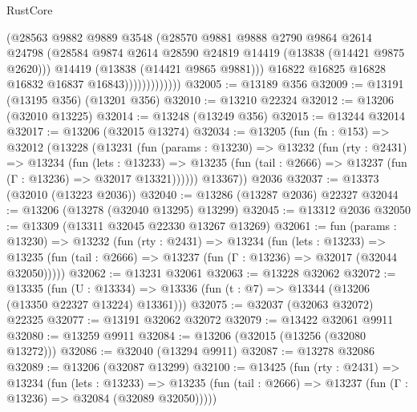 \begin{lexlean}{RustCore}
\begin{coremodule}
                            (@28563
                              @9882
                              @9889
                              @3548
                              (@28570
                                @9881
                                @9888
                                @2790
                                @9864
                                @2614
                                @24798
                                (@28584
                                  @9874
                                  @2614
                                  @28590
                                  @24819
                                  @14419
                                  (@13838 (@14421 @9875 @2620)))
                                @14419
                                (@13838 (@14421 @9865 @9881)))
                              @16822
                              @16825
                              @16828
                              @16832
                              @16837
                              @16843)))))))))))))
@32005 := @13189 @356
@32009 := @13191 (@13195 @356) (@13201 @356)
@32010 := @13210 @22324
@32012 := @13206 (@32010 @13225)
@32014 := @13248 (@13249 @356)
@32015 := @13244 @32014
@32017 := @13206 (@32015 @13274)
@32034 := @13205
    (fun (fn : @153) =>
    @32012
      (@13228
        (@13231
          (fun (params : @13230) =>
          @13232
            (fun (rty : @2431) =>
            @13234
              (fun (lets : @13233) =>
              @13235 (fun (tail : @2666) => @13237 (fun (Γ : @13236) => @32017 @13321))))))
        @13367))
    @2036
@32037 := @13373 (@32010 (@13223 @2036))
@32040 := @13286 (@13287 @2036) @22327
@32044 := @13206 (@13278 (@32040 @13295) @13299)
@32045 := @13312 @2036
@32050 := @13309 (@13311 @32045 @22330 @13267 @13269)
@32061 := fun (params : @13230) =>
  @13232
    (fun (rty : @2431) =>
    @13234
      (fun (lets : @13233) =>
      @13235 (fun (tail : @2666) => @13237 (fun (Γ : @13236) => @32017 (@32044 @32050)))))
@32062 := @13231 @32061
@32063 := @13228 @32062
@32072 := @13335
    (fun (U : @13334) => @13336 (fun (t : @7) => @13344 (@13206 (@13350 @22327 @13224) @13361)))
@32075 := @32037 (@32063 @32072) @22325
@32077 := @13191 @32062 @32072
@32079 := @13422 @32061 @9911
@32080 := @13259 @9911
@32084 := @13206 (@32015 (@13256 (@32080 @13272)))
@32086 := @32040 (@13294 @9911)
@32087 := @13278 @32086
@32089 := @13206 (@32087 @13299)
@32100 := @13425
    (fun (rty : @2431) =>
    @13234
      (fun (lets : @13233) =>
      @13235 (fun (tail : @2666) => @13237 (fun (Γ : @13236) => @32084 (@32089 @32050)))))

\end{coremodule}
\end{lexlean}
